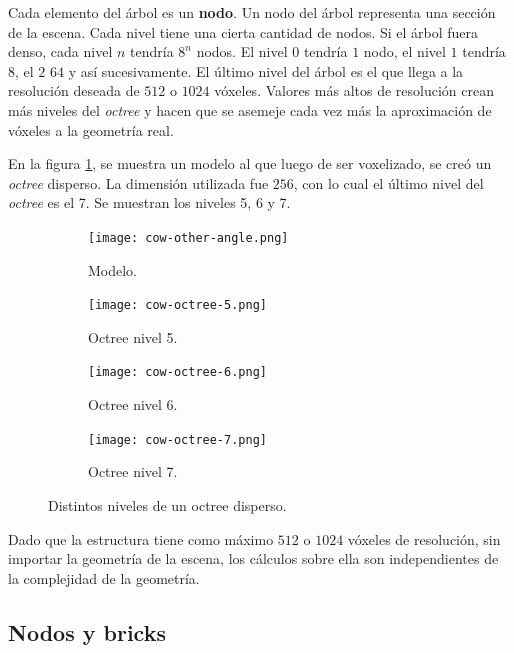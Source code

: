 Cada elemento del árbol es un \textbf{nodo}.
Un nodo del árbol representa una sección de la escena.
Cada nivel tiene una cierta cantidad de nodos.
Si el árbol fuera denso, cada nivel $n$ tendría $8^n$ nodos.
El nivel $0$ tendría $1$ nodo, el nivel $1$ tendría $8$, el $2$ $64$ y así sucesivamente. %
El último nivel del árbol es el que llega a la resolución deseada de $512$ o $1024$ vóxeles.
Valores más altos de resolución crean más niveles del \textit{octree} y hacen que se asemeje cada vez más la aproximación de vóxeles a la geometría real.

En la figura \ref{fig:octree-levels}, se muestra un modelo al que luego de ser voxelizado, se creó un \textit{octree} disperso.
La dimensión utilizada fue $256$, con lo cual el último nivel del \textit{octree} es el 7.
Se muestran los niveles 5, 6 y 7.

\begin{figure}[ht]
    \begin{subfigure}{.24\textwidth}
        \centering
        \texttt{[image: cow-other-angle.png]}
        \caption{Modelo.}
    \end{subfigure}
    \begin{subfigure}{.24\textwidth}
        \centering
        \texttt{[image: cow-octree-5.png]}
        \caption{Octree nivel 5.}
    \end{subfigure}
    \begin{subfigure}{.24\textwidth}
        \centering
        \texttt{[image: cow-octree-6.png]}
        \caption{Octree nivel 6.}
    \end{subfigure}
    \begin{subfigure}{.24\textwidth}
        \centering
        \texttt{[image: cow-octree-7.png]}
        \caption{Octree nivel 7.}
    \end{subfigure}
    \caption{Distintos niveles de un octree disperso.}
    \label{fig:octree-levels}
\end{figure}

Dado que la estructura tiene como máximo $512$ o $1024$ vóxeles de resolución, sin importar la geometría de la escena, los cálculos sobre ella son independientes de la complejidad de la geometría.

\subsection{Nodos y bricks}\label{sec:nodes_and_bricks}

